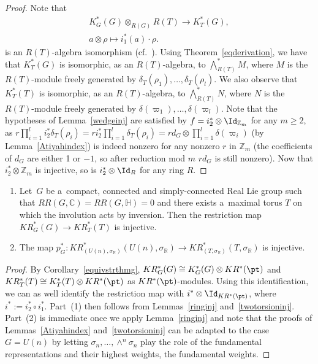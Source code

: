 \begin{proof}
Note that
\begin{gather*}
K_G^*(G)\otimes_{R(G)}R(T)  \to  K_T^*(G),
\\
a\otimes\rho  \mapsto  i_1^*(a)\cdot\rho.
\end{gather*}
is an $R(T)$-algebra isomorphism (cf.~\cite[Theorem~4.4]{HLS}).
Using Theorem~\ref{eqderivation}, we have that $K_T^*(G)$ is isomorphic, as an $R(T)$-algebra, to $\bigwedge_{R(T)}^*M$,
where $M$ is the $R(T)$-module freely generated by $\delta_T(\rho_1), \dots, \delta_T(\rho_l)$.
We also observe that $K_T^*(T)$ is isomorphic, as an $R(T)$-algebra, to $\bigwedge_{R(T)}^*N$, where $N$ is the
$R(T)$-module freely generated by $\delta(\varpi_1), \dots, \delta(\varpi_l)$.
Note that the hypotheses of Lemma~\ref{wedgeinj} are satisf\/ied by $f=i_2^*\otimes\Id_{\mathbb{Z}_m}$ for any
$m\geq 2$, as
$r\prod\limits_{i=1}^li_2^*\delta_T(\rho_i)=ri_2^*\prod\limits_{i=1}^l\delta_T(\rho_i)=rd_G\otimes\prod\limits_{i=1}^l\delta(\varpi_i)$
(by Lemma~\ref{Atiyahindex}) is indeed nonzero for any nonzero $r$ in $\mathbb{Z}_m$ (the coef\/f\/icients of $d_G$ are
either 1 or $-1$, so after reduction mod $m$ $rd_G$ is still nonzero).
Now that $i_2^*\otimes\mathbb{Z}_m$ is injective, so is $i_2^*\otimes\Id_R$ for any ring $R$.
\end{proof}

\begin{Proposition}\label{pginjective}{\samepage\quad
\begin{enumerate}\itemsep=0pt
\item[$1.$]
Let~$G$ be a~compact, connected and simply-connected Real Lie group such that $RR(G, \mathbb{C})=RR(G, \mathbb{H})=0$
and there exists a~maximal torus $T$ on which the involution acts by inversion.
Then the restriction map
$KR_{G}^*(G)\to KR_T^*(T)$
is injective.
\item[$2.$]
The map $p_G^*: KR_{(U(n),
\sigma_\mathbb{R})}^*(U(n),
\sigma_\mathbb{R})\to KR_{(T,
\sigma_\mathbb{R})}^*(T,
\sigma_\mathbb{R})$ is injective.
\end{enumerate}}
\end{Proposition}

\begin{proof}
By Corollary~\ref{equivstrthmg}, $KR^*_G(G)\cong K^*_G(G)\otimes KR^*(\pt)$ and $KR_T^*(T)\cong K^*_T(T)\otimes
KR^*(\pt)$ as $KR^*(\pt)$-modules.
Using this identif\/ication, we can as well identify the restriction map with $i^*\otimes\Id_{KR^*(\pt)}$,
where $i^*:=i_2^*\circ i_1^*$.
Part~(1) then follows from Lemmas~\ref{ringinj} and~\ref{twotorsioninj}.
Part~(2) is immediate once we apply Lemma~\ref{ringinj} and note that the proofs of Lemmas~\ref{Atiyahindex}
and~\ref{twotorsioninj} can be adapted to the case $G=U(n)$ by letting $\sigma_n, \dots, \wedge^n\sigma_n$
play the role of the fundamental representations and their highest weights, the
fundamental weights.
\end{proof}

